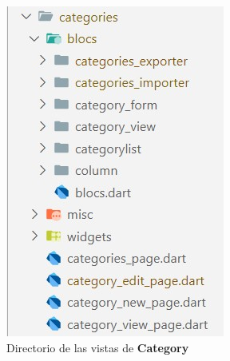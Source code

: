 \documentclass[12pt, a4paper]{book}
\begin{document}
\begin{figure}[H]
\begin{minipage}[b]{0.3\textwidth}
    \includegraphics[width=\textwidth]{images/category_page.jpg}
    \caption{Directorio de las vistas de \textbf{Category}}
    \label{fig:categorypage}
  \end{minipage}
  \hspace{0.02\textwidth}
  \begin{minipage}[b]{0.3\textwidth}
    \centering

\end{minipage}
\end{figure}
\end{document}
